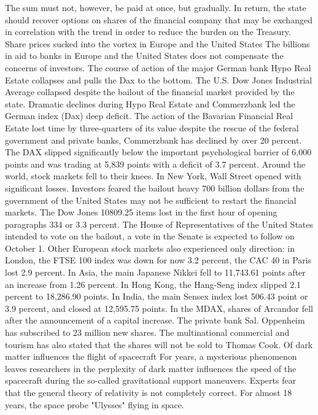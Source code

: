 The sum must not, however, be paid at once, but gradually.
In return, the state should recover options on shares of the financial company that may be exchanged in correlation with the trend in order to reduce the burden on the Treasury.
Share prices sucked into the vortex in Europe and the United States
The billions in aid to banks in Europe and the United States does not compensate the concerns of investors.
The course of action of the major German bank Hypo Real Estate collapses and pulls the Dax to the bottom.
The U.S. Dow Jones Industrial Average collapsed despite the bailout of the financial market provided by the state.
Dramatic declines during Hypo Real Estate and Commerzbank led the German index (Dax) deep deficit.
The action of the Bavarian Financial Real Estate lost time by three-quarters of its value despite the rescue of the federal government and private banks, Commerzbank has declined by over 20 percent.
The DAX slipped significantly below the important psychological barrier of 6,000 points and was trading at 5,839 points with a deficit of 3.7 percent.
Around the world, stock markets fell to their knees.
In New York, Wall Street opened with significant losses.
Investors feared the bailout heavy 700 billion dollars from the government of the United States may not be sufficient to restart the financial markets.
The Dow Jones 10809.25 items lost in the first hour of opening paragraphs 334 or 3.3 percent.
The House of Representatives of the United States intended to vote on the bailout, a vote in the Senate is expected to follow on October 1.
Other European stock markets also experienced only direction: in London, the FTSE 100 index was down for now 3.2 percent, the CAC 40 in Paris lost 2.9 percent.
In Asia, the main Japanese Nikkei fell to 11,743.61 points after an increase from 1.26 percent.
In Hong Kong, the Hang-Seng index slipped 2.1 percent to 18,286.90 points.
In India, the main Sensex index lost 506.43 point or 3.9 percent, and closed at 12,595.75 points.
In the MDAX, shares of Arcandor fell after the announcement of a capital increase.
The private bank Sal. Oppenheim has subscribed to 23 million new shares.
The multinational commercial and tourism has also stated that the shares will not be sold to Thomas Cook.
Of dark matter influences the flight of spacecraft
For years, a mysterious phenomenon leaves researchers in the perplexity of dark matter influences the speed of the spacecraft during the so-called gravitational support maneuvers.
Experts fear that the general theory of relativity is not completely correct.
For almost 18 years, the space probe "Ulysses" flying in space.
